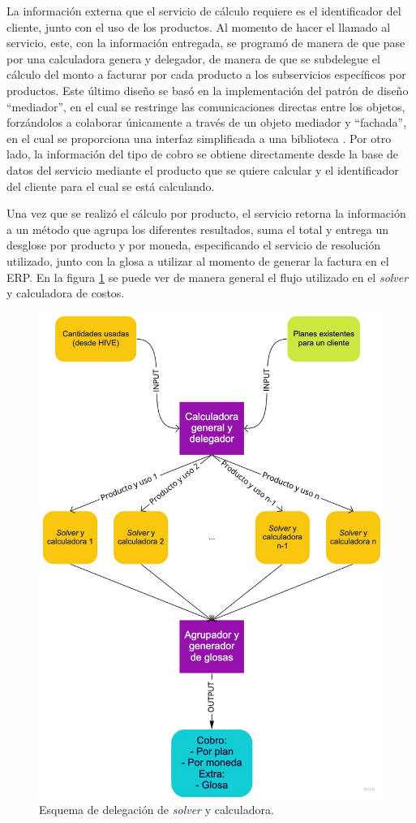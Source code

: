     La información externa que el servicio de cálculo requiere es el identificador del cliente, junto con el uso de los productos. Al momento de hacer el llamado al servicio, este, con la información entregada, se programó de manera de que pase por una calculadora genera y delegador, de manera de que se subdelegue el cálculo del monto a facturar por cada producto a los subservicios específicos por productos. Este último diseño se basó en la implementación del patrón de diseño ``mediador'', en el cual se restringe las comunicaciones directas entre los objetos, forzándolos a colaborar únicamente a través de un objeto mediador \cite{pattern_mediator} y ``fachada'', en el cual se proporciona una interfaz simplificada a una biblioteca \cite{pattern_facade}. Por otro lado, la información del tipo de cobro se obtiene directamente desde la base de datos del servicio mediante el producto que se quiere calcular y el identificador del cliente para el cual se está calculando.
    
    Una vez que se realizó el cálculo por producto, el servicio retorna la información a un método que agrupa los diferentes resultados, suma el total y entrega un desglose por producto y por moneda, especificando el servicio de resolución utilizado, junto con la glosa a utilizar al momento de generar la factura en el ERP. En la figura \ref{fig:cc_calculator} se puede ver de manera general el flujo utilizado en el \textit{solver} y calculadora de costos.

    \begin{figure}
      \centering
      \includegraphics[width=0.5\linewidth]{figures/cc/cc_calculator.jpg}
      \caption{Esquema de delegación de \textit{solver} y calculadora.}
      \label{fig:cc_calculator}
    \end{figure}


